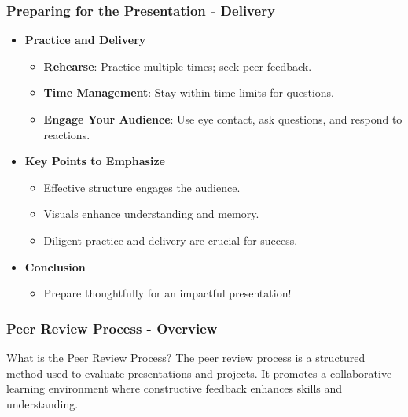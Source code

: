 \documentclass{beamer}
\begin{document}
\begin{frame}[fragile]
    \frametitle{Preparing for the Presentation - Delivery}
    
    \begin{itemize}
        \item \textbf{Practice and Delivery}
        \begin{itemize}
            \item \textbf{Rehearse}: Practice multiple times; seek peer feedback.
            \item \textbf{Time Management}: Stay within time limits for questions.
            \item \textbf{Engage Your Audience}: Use eye contact, ask questions, and respond to reactions.
        \end{itemize}
        
        \item \textbf{Key Points to Emphasize}
        \begin{itemize}
            \item Effective structure engages the audience.
            \item Visuals enhance understanding and memory.
            \item Diligent practice and delivery are crucial for success.
        \end{itemize}
        
        \item \textbf{Conclusion}
        \begin{itemize}
            \item Prepare thoughtfully for an impactful presentation!
        \end{itemize}
    \end{itemize}
\end{frame}

\begin{frame}[fragile]
    \frametitle{Peer Review Process - Overview}
    \begin{block}{What is the Peer Review Process?}
        The peer review process is a structured method used to evaluate presentations and projects. It promotes a collaborative learning environment where constructive feedback enhances skills and understanding.
    \end{block}
\end{frame}
\end{document}
